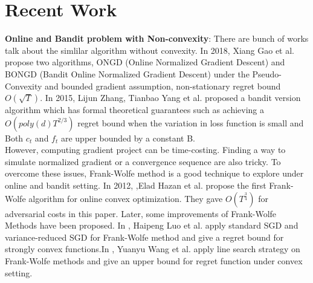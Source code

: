 \documentclass[12pt]{article}
\begin{document}
\section{Recent Work}
\textbf{Online and Bandit problem with Non-convexity}: There are bunch of works talk about the simlilar algorithm without convexity. In 2018, Xiang Gao et al. \cite{gao2018online} propose two algorithms, ONGD (Online Normalized Gradient Descent) and BONGD (Bandit Online Normalized Gradient Descent) under the Pseudo-Convexity and bounded gradient assumption, non-stationary regret bound $O(\sqrt{T})$.  In 2015, 
Lijun Zhang, Tianbao Yang et al. \cite{zhang2015online} proposed a bandit version algorithm which has formal theoretical guarantees such as achieving a $O(poly(d)T^{2/3})$ regret bound when the variation in loss function is small and Both $c_t$ and $f_t$ are upper bounded by a constant B.\\
However, computing gradient project can be time-costing. Finding a way to simulate normalized gradient or a convergence sequence are also tricky. To overcome these issues, Frank-Wolfe method is a good technique to explore under online and bandit setting. In 2012, \cite{DBLP:journals/corr/abs-1206-4657},Elad Hazan et al. propose the first Frank-Wolfe algorithm for online convex optimization. They gave $O(T^{\frac{3}{4}})$ for adversarial costs in this paper. Later, some improvements of Frank-Wolfe Methods have been proposed. In \cite{DBLP:journals/corr/HazanL16}, Haipeng Luo et al. apply standard SGD and variance-reduced SGD for Frank-Wolfe method and give a regret bound for strongly convex functions.In \cite{DBLP:journals/corr/abs-1206-4657}, Yuanyu Wang et al. apply line search strategy on Frank-Wolfe methods and give an upper bound for regret function under convex setting. 
\end{document}
